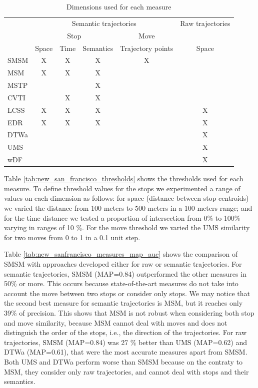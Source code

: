 \begin{table}[!h]
\scriptsize
  \centering
  \begin{tabular}{|l|c|c|c|c|c|}
  \hline
  & \multicolumn{4}{c|}{Semantic trajectories} & \multicolumn{1}{c|}{Raw trajectories} \\
 	\cline{2-5}
  & \multicolumn{3}{c|}{Stop} & \multicolumn{1}{c|}{Move} & \multicolumn{1}{c|}{} \\
 	\cline{2-6}
  & Space & Time & Semantics & Trajectory points & Space\\
  \hline
 SMSM & X & X & X & X & \\
 MSM & X & X & X & &\\
 MSTP &  &  & X & & \\
 CVTI & & X & X & & \\
 LCSS & X & X & X & & X \\
 EDR & X & X & X & & X \\
 DTWa &  &  &  & & X \\
 UMS & & & & & X \\
 wDF & & & & & X \\
    \hline
  \end{tabular}
  \caption{Dimensions used for each measure}
  \label{tab:new_san_francisco_measures}
\end{table}

{Table {\ref{tab:new_san_francisco_thresholds}} shows the  thresholds used for each measure. To define threshold values for the stops we experimented  a range of values on each dimension as follows: for space (distance between stop centroids) we varied the distance from 100 meters to 500 meters in a 100 meters range; and for the time distance we tested a proportion of intersection from 0\% to 100\% varying in ranges of 10 \%. For the move threshold we varied the UMS similarity for two moves from 0 to 1 in a 0.1 unit step.

Table {\ref{tab:new_sanfrancisco_measures_map_auc}} shows the comparison of SMSM with approaches developed either for raw or semantic trajectories.
For semantic trajectories, SMSM (MAP=0.84) outperformed the other measures in 50\% or more. This occurs because state-of-the-art measures do not take into account the move between two stops or consider only stops. We may notice that the second best measure for semantic trajectories is MSM, but it reaches only 39\% of precision. This shows that MSM is not robust when considering both stop and move similarity, because MSM cannot deal with moves and does not distinguish the order of the stops, i.e., the direction of the trajectories. 
For raw trajectories, SMSM (MAP=0.84) was 27 \% better than UMS (MAP=0.62) and DTWa (MAP=0.61), that were the most accurate measures apart from SMSM. Both UMS and DTWa perform  worse than SMSM because on the contraty to MSM, they consider only raw trajectories, and cannot deal with stops and their semantics.}

